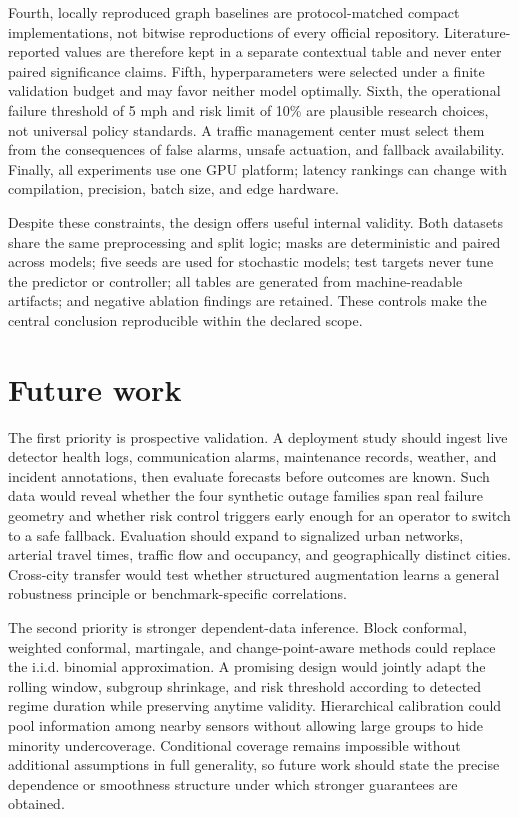 \documentclass[pdflatex,sn-mathphys-num]{sn-jnl}
\begin{document}
Fourth, locally reproduced graph baselines are protocol-matched compact
implementations, not bitwise reproductions of every official repository.
Literature-reported values are therefore kept in a separate contextual table
and never enter paired significance claims. Fifth, hyperparameters were selected
under a finite validation budget and may favor neither model optimally. Sixth,
the operational failure threshold of 5 mph and risk limit of 10\% are plausible
research choices, not universal policy standards. A traffic management center
must select them from the consequences of false alarms, unsafe actuation, and
fallback availability. Finally, all experiments use one GPU platform; latency
rankings can change with compilation, precision, batch size, and edge hardware.

Despite these constraints, the design offers useful internal validity. Both
datasets share the same preprocessing and split logic; masks are deterministic
and paired across models; five seeds are used for stochastic models; test
targets never tune the predictor or controller; all tables are generated from
machine-readable artifacts; and negative ablation findings are retained. These
controls make the central conclusion reproducible within the declared scope.

\section{Future work}
The first priority is prospective validation. A deployment study should ingest
live detector health logs, communication alarms, maintenance records, weather,
and incident annotations, then evaluate forecasts before outcomes are known.
Such data would reveal whether the four synthetic outage families span real
failure geometry and whether risk control triggers early enough for an operator
to switch to a safe fallback. Evaluation should expand to signalized urban
networks, arterial travel times, traffic flow and occupancy, and geographically
distinct cities. Cross-city transfer would test whether structured augmentation
learns a general robustness principle or benchmark-specific correlations.

The second priority is stronger dependent-data inference. Block conformal,
weighted conformal, martingale, and change-point-aware methods could replace the
i.i.d. binomial approximation. A promising design would jointly adapt the
rolling window, subgroup shrinkage, and risk threshold according to detected
regime duration while preserving anytime validity. Hierarchical calibration
could pool information among nearby sensors without allowing large groups to
hide minority undercoverage. Conditional coverage remains impossible without
additional assumptions in full generality, so future work should state the
precise dependence or smoothness structure under which stronger guarantees are
obtained.
\end{document}
